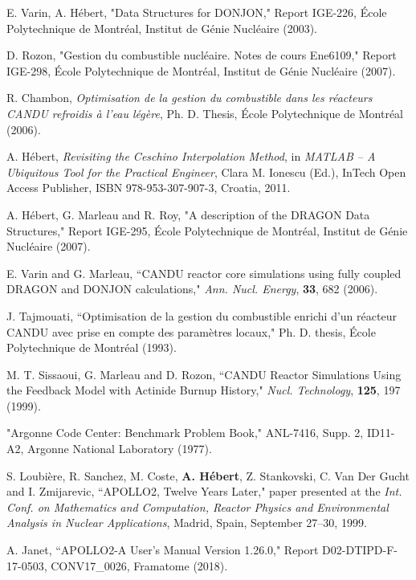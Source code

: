 \begin{thebibliography}{99}
E. Varin, A. H\'ebert,
"Data Structures for DONJON," 
Report IGE-226, \'Ecole Polytechnique de Montr\'eal,
 Institut de G\'enie Nucl\'eaire (2003).

D. Rozon, 
"Gestion du combustible nucl\'eaire. Notes de cours Ene6109,"
Report IGE-298, \'Ecole Polytechnique de Montr\'eal,
 Institut de G\'enie Nucl\'eaire (2007).

R. Chambon,
{\sl Optimisation de la gestion du combustible dans les r\'eacteurs
CANDU refroidis \`a l'eau l\'eg\`ere}, Ph. D. Thesis, \'Ecole Polytechnique de Montr\'eal (2006). 

A. H\'ebert, {\sl Revisiting the Ceschino Interpolation Method}, in {\sl MATLAB -- A Ubiquitous Tool for the Practical
Engineer}, Clara M. Ionescu (Ed.), InTech Open Access Publisher, ISBN 978-953-307-907-3, Croatia, 2011.

A. H\'ebert, G. Marleau and R. Roy, 
"A description of the DRAGON Data Structures," 
Report IGE-295, \'Ecole Polytechnique de Montr\'eal,
 Institut de G\'enie Nucl\'eaire (2007).

E. Varin and G. Marleau, ``CANDU reactor core simulations using fully coupled DRAGON and DONJON calculations,"
{\sl Ann. Nucl. Energy}, {\bf 33}, 682 (2006).

J. Tajmouati, ``Optimisation de la gestion du combustible enrichi d'un r\'eacteur CANDU
avec prise en compte des param\`etres locaux," Ph. D. thesis, \'Ecole Polytechnique de
Montr\'eal (1993).

M. T. Sissaoui, G. Marleau and D. Rozon, ``CANDU Reactor Simulations Using the
Feedback Model with Actinide Burnup History," {\sl Nucl. Technology}, {\bf 125},
197 (1999).

"Argonne Code Center: Benchmark Problem Book," ANL-7416, Supp. 2, ID11-A2, 
Argonne National Laboratory (1977).

S. Loubi\`ere, R. Sanchez, M. Coste, {\bf A. H\'ebert}, Z. Stankovski, C. Van Der Gucht and I. Zmijarevic, ``APOLLO2,
Twelve Years Later," paper presented at the {\sl Int. Conf. on Mathematics and Computation,
Reactor Physics and Environmental Analysis in Nuclear Applications}, Madrid, Spain, September 27--30, 1999.

A. Janet, ``APOLLO2-A User's Manual Version 1.26.0," Report D02-DTIPD-F-17-0503, CONV17\_0026, Framatome (2018).


\end{thebibliography}
